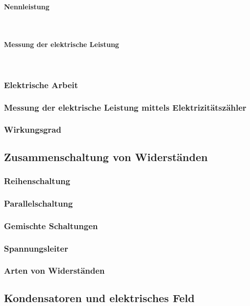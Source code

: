 		\paragraph{Nennleistung}~\\
		\paragraph{Messung der elektrische Leistung}~\\
	\subsubsection{Elektrische Arbeit}
	\subsubsection{Messung der elektrische Leistung mittels Elektrizitätszähler}
	\subsubsection{Wirkungsgrad}
	

\subsection{Zusammenschaltung von Widerständen}
\subsubsection{Reihenschaltung}
\subsubsection{Parallelschaltung}
\subsubsection{Gemischte Schaltungen}
\subsubsection{Spannungsleiter}
\subsubsection{Arten von Widerständen}

\subsection{Kondensatoren und elektrisches Feld}
